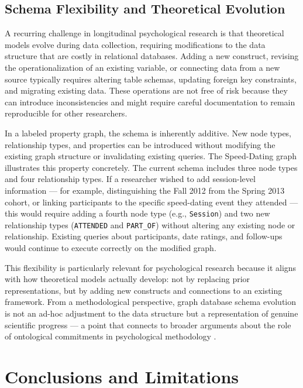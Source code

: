 \documentclass[sn-apa,pdflatex]{sn-jnl}
\theoremstyle{remark}
\theoremstyle{definition}
\begin{document}
\subsection{Schema Flexibility and Theoretical
Evolution}\label{schema-flexibility-and-theoretical-evolution}

A recurring challenge in longitudinal psychological research is that
theoretical models evolve during data collection, requiring
modifications to the data structure that are costly in relational
databases. Adding a new construct, revising the operationalization of an
existing variable, or connecting data from a new source typically
requires altering table schemas, updating foreign key constraints, and
migrating existing data. These operations are not free of risk because
they can introduce inconsistencies and might require careful
documentation to remain reproducible for other researchers.

In a labeled property graph, the schema is inherently additive. New node
types, relationship types, and properties can be introduced without
modifying the existing graph structure or invalidating existing queries.
The Speed-Dating graph illustrates this property concretely. The current
schema includes three node types and four relationship types. If a
researcher wished to add session-level information --- for example,
distinguishing the Fall 2012 from the Spring 2013 cohort, or linking
participants to the specific speed-dating event they attended --- this
would require adding a fourth node type (e.g., \texttt{Session}) and two
new relationship types (\texttt{ATTENDED} and \texttt{PART\_OF}) without
altering any existing node or relationship. Existing queries about
participants, date ratings, and follow-ups would continue to execute
correctly on the modified graph.

This flexibility is particularly relevant for psychological research
because it aligns with how theoretical models actually develop: not by
replacing prior representations, but by adding new constructs and
connections to an existing framework. From a methodological perspective,
graph database schema evolution is not an ad-hoc adjustment to the data
structure but a representation of genuine scientific progress --- a
point that connects to broader arguments about the role of ontological
commitments in psychological methodology \citep{burgos2025}.

\section{Conclusions and Limitations}\label{sec6}
\end{document}

